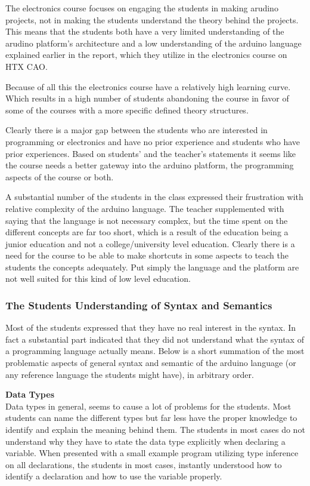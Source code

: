 The electronics course focuses on engaging the students in making arudino projects, not in making the students understand the theory behind the projects. This means that the students both have a very limited understanding of the arudino platform's architecture and a low understanding of the arduino language explained earlier in the report, which they utilize in the electronics course on HTX CAO.

Because of all this the electronics course have a relatively high learning curve. Which results in a high number of students abandoning the course in favor of some of the courses with a more specific defined theory structures.

Clearly there is a major gap between the students who are interested in programming or electronics and have no prior experience and students who have prior experiences. 
Based on students' and the teacher's statements it seems like the course needs a better gateway into the arduino platform, the programming aspects of the course or both.

A substantial number of the students in the class expressed their frustration with relative complexity of the arduino language. The teacher supplemented with saying that the language is not necessary complex, but the time spent on the different concepts are far too short, which is a result of the education being a junior education and not a college/university level education.
Clearly there is a need for the course to be able to make shortcuts in some aspects to teach the students the concepts adequately. Put simply the language and the platform are not well suited for this kind of low level education.

\subsubsection{The Students Understanding of Syntax and Semantics}
Most of the students expressed that they have no real interest in the syntax. In fact a substantial part indicated that they did not understand what the syntax of a programming language actually means. Below is a short summation of the most problematic aspects of general syntax and semantic of the arduino language (or any reference language the students might have), in arbitrary order.

\textbf{Data Types}\\
Data types in general, seems to cause a lot of problems for the students. Most students can name the different types but far less have the proper knowledge to identify and explain the meaning behind them. The students in most cases do not understand why they have to state the data type explicitly when declaring a variable. When presented with a small example program utilizing type inference on all declarations, the students in most cases, instantly understood how to identify a declaration and how to use the variable properly.


